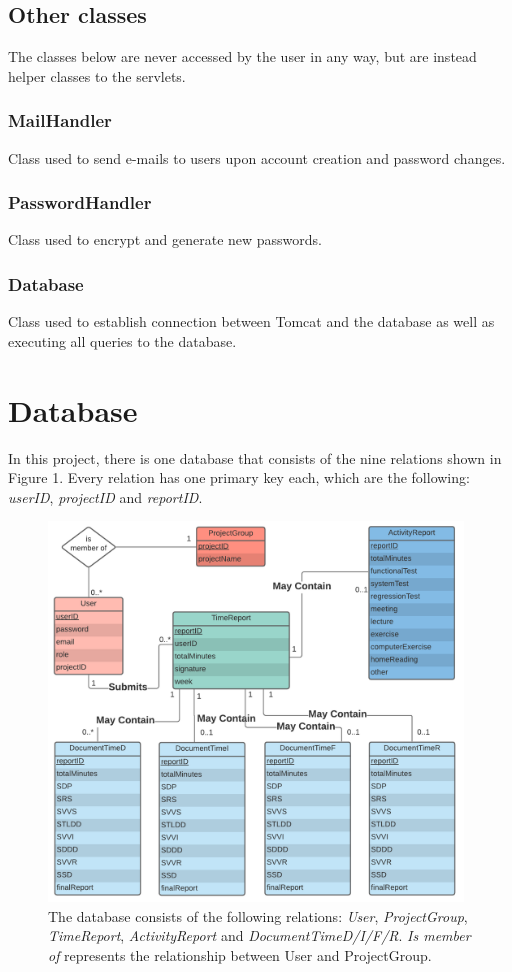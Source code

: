 \documentclass{article}
\begin{document}
\subsection{Other classes}
The classes below are never accessed by the user in any way, but are instead helper classes to the servlets.

\subsubsection{MailHandler}
Class used to send e-mails to users upon account creation and password changes.

\subsubsection{PasswordHandler}
Class used to encrypt and generate new passwords.

\subsubsection{Database}
Class used to establish connection between Tomcat and the database as well as executing all queries to the database.

\section{Database}
In this project, there is one database that consists of the nine relations shown in Figure 1. Every relation has one primary key each, which are the following: \emph{userID}, \emph{projectID} and \emph{reportID}.

\begin{figure}[H]
     \centering
     \includegraphics[width=11cm]{images/PUSPERdiagramVers3_2.png}
     \renewcommand\figurename{Figure}
     \caption{The database consists of the following relations: \emph{User}, \emph{ProjectGroup}, \emph{TimeReport}, \emph{ActivityReport} and \emph{DocumentTimeD/I/F/R}. \emph{Is member of} represents the relationship between User and ProjectGroup.}
     \label{fig:my_label}
 \end{figure}
\end{document}
